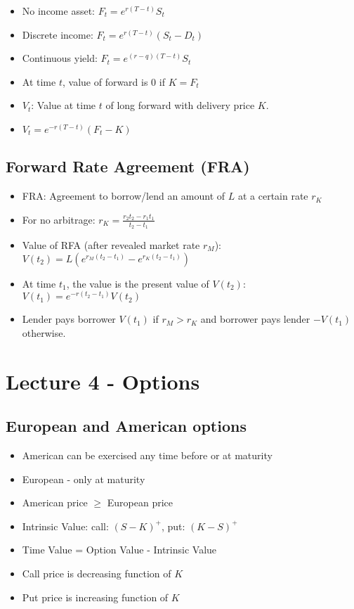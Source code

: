 \documentclass{article}
\begin{document}
\begin{itemize}
	\item No income asset: $F_t = e^{r(T-t)}S_t$
	\item Discrete income: $F_t = e^{r(T-t)}(S_t - D_t)$
	\item Continuous yield: $F_t = e^{(r-q)(T-t)}S_t$
	\item At time $t$, value of forward is 0 if $K=F_t$
	\item $V_t$: Value at time $t$ of long forward with delivery price $K$.
	\item $V_t = e^{-r(T-t)}(F_t - K)$
\end{itemize}

\subsection*{Forward Rate Agreement (FRA)}

\begin{itemize}
	\item FRA: Agreement to borrow/lend an amount of $L$ at a certain rate $r_K$
	\item For no arbitrage: $r_K = \frac{r_2t_2 - r_1t_1}{t_2 - t_1}$
	\item Value of RFA (after revealed market rate $r_M$): $V(t_2) = L\left(e^{r_M(t_2-t_1)} - e^{r_K(t_2-t_1)}\right)$
	\item At time $t_1$, the value is the present value of $V(t_2)$: $V(t_1) = e^{-r(t_2-t_1)}V(t_2)$
	\item Lender pays borrower $V(t_1)$ if $r_M > r_K$ and borrower pays lender $-V(t_1)$ otherwise.
\end{itemize}

\section*{Lecture 4 - Options}

\subsection*{European and American options}

\begin{itemize}
	\item American can be exercised any time before or at maturity
	\item European - only at maturity
	\item American price $\geq$ European price
	\item Intrinsic Value: call: $(S-K)^+$, put: $(K-S)^+$
	\item Time Value = Option Value - Intrinsic Value
	\item Call price is decreasing function of $K$
	\item Put price is increasing function of $K$
\end{itemize}
\end{document}
